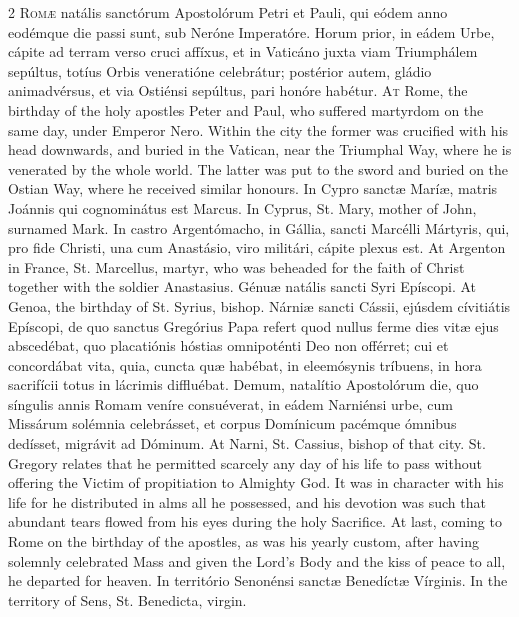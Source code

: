 \begin{paracol}{2}
\lettrine[lines=2]{R}{omæ} natális sanctórum 
 Apostolórum Petri et Pauli, qui eódem anno eodémque die passi sunt, sub 
 Neróne Imperatóre. Horum prior, in eádem Urbe, cápite ad terram verso 
 cruci affíxus, et in Vaticáno juxta viam Triumphálem sepúltus, totíus Orbis 
 veneratióne celebrátur; postérior autem, gládio animadvérsus, et via 
 Ostiénsi sepúltus, pari honóre habétur.
\switchcolumn
{}
\lettrine[lines=2]{A}{t} Rome, the birthday of the holy 
 apostles Peter and Paul, who suffered martyrdom on the same day, under 
 Emperor Nero. Within the city the former was crucified with his head 
 downwards, and buried in the Vatican, near the Triumphal Way, where he is 
 venerated by the whole world. The latter was put to the sword and 
 buried on the Ostian Way, where he received similar honours.
\switchcolumn*
{}
In Cypro sanctæ Maríæ, 
 matris Joánnis qui cognominátus est Marcus.
\switchcolumn
{}
In Cyprus, St. Mary, mother of John, 
 surnamed Mark.
\switchcolumn*
{}
In castro Argentómacho, 
 in Gállia, sancti Marcélli Mártyris, qui, pro fide Christi, una cum 
 Anastásio, viro militári, cápite plexus est.
\switchcolumn
{}
At Argenton in France, St. 
 Marcellus, martyr, who was beheaded for the faith of Christ together with 
 the soldier Anastasius.
\switchcolumn*
{}
Génuæ natális sancti 
 Syri Epíscopi.
\switchcolumn
{}
At Genoa, the birthday of St. Syrius, 
 bishop.
\switchcolumn*
{}
Nárniæ sancti Cássii, 
 ejúsdem cívitiátis Epíscopi, de quo sanctus Gregórius Papa refert quod 
 nullus ferme dies vitæ ejus abscedébat, quo placatiónis hóstias omnipoténti 
 Deo non offérret; cui et concordábat vita, quia, cuncta quæ habébat, in 
 eleemósynis tríbuens, in hora sacrifícii totus in lácrimis diffluébat. 
 Demum, natalítio Apostolórum die, quo síngulis annis Romam veníre 
 consuéverat, in eádem Narniénsi urbe, cum Missárum solémnia celebrásset, et 
 corpus Domínicum pacémque ómnibus dedísset, migrávit ad Dóminum.
\switchcolumn
{}
At Narni, St. Cassius, bishop of 
 that city. St. Gregory relates that he permitted scarcely any day of 
 his life to pass without offering the Victim of propitiation to Almighty 
 God. It was in character with his life for he distributed in alms all 
 he possessed, and his devotion was such that abundant tears flowed from his 
 eyes during the holy Sacrifice. At last, coming to Rome on the 
 birthday of the apostles, as was his yearly custom, after having solemnly 
 celebrated Mass and given the Lord's Body and the kiss of peace to all, he 
 departed for heaven.
\switchcolumn*
{}
In território Senonénsi 
 sanctæ Benedíctæ Vírginis.
\switchcolumn
{}
In the territory of Sens, St. 
 Benedicta, virgin.
\switchcolumn*
{}
\end{paracol}


